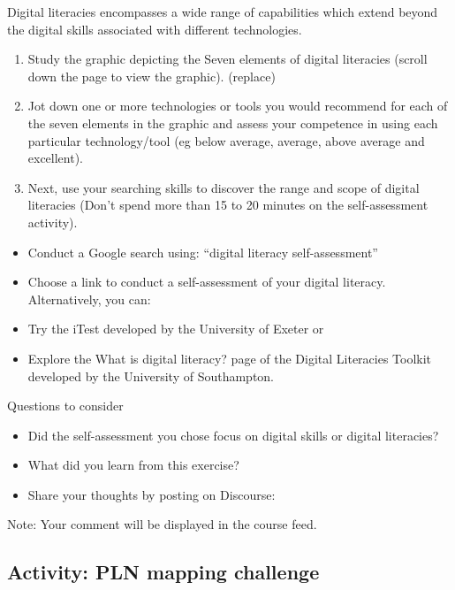 \documentclass[
]{book}
\providecommand{\tightlist}{%
  \setlength{\itemsep}{0pt}\setlength{\parskip}{0pt}}
\theoremstyle{definition}
\theoremstyle{definition}
\theoremstyle{definition}
\theoremstyle{definition}
\theoremstyle{remark}
\begin{document}
\begin{reflect}
Digital literacies encompasses a wide range of capabilities which extend beyond the digital skills associated with different technologies.

\begin{enumerate}
\def\labelenumi{\arabic{enumi}.}
\item
  Study the graphic depicting the Seven elements of digital literacies (scroll down the page to view the graphic). (replace)
\item
  Jot down one or more technologies or tools you would recommend for each of the seven elements in the graphic and assess your competence in using each particular technology/tool (eg below average, average, above average and excellent).
\item
  Next, use your searching skills to discover the range and scope of digital literacies (Don't spend more than 15 to 20 minutes on the self-assessment activity).
\end{enumerate}

\begin{itemize}
\tightlist
\item
  Conduct a Google search using: ``digital literacy self-assessment''
\item
  Choose a link to conduct a self-assessment of your digital literacy.
  Alternatively, you can:
\item
  Try the iTest developed by the University of Exeter or
\item
  Explore the What is digital literacy? page of the Digital Literacies Toolkit developed by the University of Southampton.
\end{itemize}

Questions to consider

\begin{itemize}
\tightlist
\item
  Did the self-assessment you chose focus on digital skills or digital literacies?
\item
  What did you learn from this exercise?
\item
  Share your thoughts by posting on Discourse:
\end{itemize}

Note: Your comment will be displayed in the course feed.
\end{reflect}

\hypertarget{activity-pln-mapping-challenge}{%
\subsection*{Activity: PLN mapping challenge}\label{activity-pln-mapping-challenge}}
\end{document}
